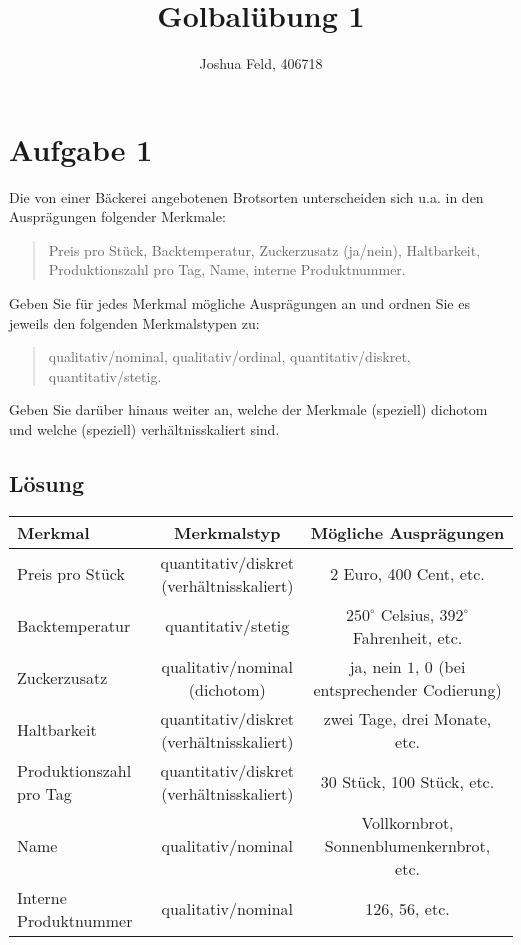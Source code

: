 \documentclass{exercise}
\institute{Institut für Statistik und Wirtschaftsmathematik}
\title{Golbalübung 1}
\author{Joshua Feld, 406718}
\begin{document}
    \maketitle


    \section*{Aufgabe 1}

    \begin{problem}
        Die von einer Bäckerei angebotenen Brotsorten unterscheiden sich u.a. in den Ausprägungen folgender Merkmale:
        \begin{quote}
            Preis pro Stück, Backtemperatur, Zuckerzusatz (ja/nein), Haltbarkeit, Produktionszahl pro Tag, Name, interne Produktnummer.
        \end{quote}
        Geben Sie für jedes Merkmal mögliche Ausprägungen an und ordnen Sie es jeweils den folgenden Merkmalstypen zu:
        \begin{quote}
            qualitativ/nominal, qualitativ/ordinal, quantitativ/diskret, quantitativ/stetig.
        \end{quote}
        Geben Sie darüber hinaus weiter an, welche der Merkmale (speziell) dichotom und welche (speziell) verhältnisskaliert sind.
    \end{problem}

    \subsection*{Lösung}
    \begin{center}
        \begin{tabular}{lcc}
            \toprule
            Merkmal & Merkmalstyp & Mögliche Ausprägungen\\
            \midrule
            Preis pro Stück & \makecell{quantitativ/diskret\\(verhältnisskaliert)} & 2 Euro, 400 Cent, etc.\\
            Backtemperatur & quantitativ/stetig & \(250^\circ\) Celsius, \(392^\circ\) Fahrenheit, etc.\\
            Zuckerzusatz & \makecell{qualitativ/nominal\\(dichotom)} & \makecell{ja, nein\\\(1\), \(0\) (bei entsprechender Codierung)}\\
            Haltbarkeit & \makecell{quantitativ/diskret\\(verhältnisskaliert)} & zwei Tage, drei Monate, etc.\\
            Produktionszahl pro Tag & \makecell{quantitativ/diskret\\(verhältnisskaliert)} & 30 Stück, 100 Stück, etc.\\
            Name & qualitativ/nominal & Vollkornbrot, Sonnenblumenkernbrot, etc.\\
            Interne Produktnummer & qualitativ/nominal & 126, 56, etc.\\
            \bottomrule
        \end{tabular}
    \end{center}
\end{document}
